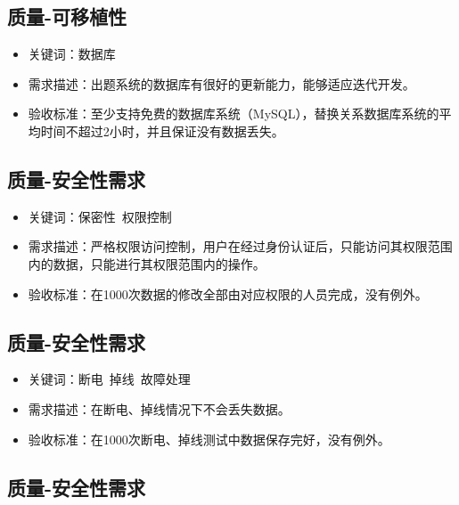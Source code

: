\documentclass[hyperref, a4paper]{ctexart}
\providecommand{\tightlist}{%
  \setlength{\itemsep}{0pt}\setlength{\parskip}{0pt}}
\begin{document}
\hypertarget{ux8d28ux91cf-ux53efux79fbux690dux6027-2}{%
\subsection{质量-可移植性}\label{ux8d28ux91cf-ux53efux79fbux690dux6027-2}}

\begin{itemize}
\tightlist
\item
  关键词：数据库
\item
  需求描述：出题系统的数据库有很好的更新能力，能够适应迭代开发。
\item
  验收标准：至少支持免费的数据库系统（MySQL），替换关系数据库系统的平均时间不超过2小时，并且保证没有数据丢失。
\end{itemize}

\hypertarget{ux8d28ux91cf-ux5b89ux5168ux6027ux9700ux6c42}{%
\subsection{质量-安全性需求}\label{ux8d28ux91cf-ux5b89ux5168ux6027ux9700ux6c42}}

\begin{itemize}
\tightlist
\item
  关键词：保密性~权限控制
\item
  需求描述：严格权限访问控制，用户在经过身份认证后，只能访问其权限范围内的数据，只能进行其权限范围内的操作。
\item
  验收标准：在1000次数据的修改全部由对应权限的人员完成，没有例外。
\end{itemize}

\hypertarget{ux8d28ux91cf-ux5b89ux5168ux6027ux9700ux6c42-1}{%
\subsection{质量-安全性需求}\label{ux8d28ux91cf-ux5b89ux5168ux6027ux9700ux6c42-1}}

\begin{itemize}
\tightlist
\item
  关键词：断电~掉线~故障处理
\item
  需求描述：在断电、掉线情况下不会丢失数据。
\item
  验收标准：在1000次断电、掉线测试中数据保存完好，没有例外。
\end{itemize}

\hypertarget{ux8d28ux91cf-ux5b89ux5168ux6027ux9700ux6c42-2}{%
\subsection{质量-安全性需求}\label{ux8d28ux91cf-ux5b89ux5168ux6027ux9700ux6c42-2}}
\end{document}
